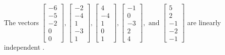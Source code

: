 \begin{exercise}
\begin{exerciseStatement}
  \end{exerciseStatement}
  \begin{exerciseAnswer}
   The vectors \(\left[\begin{array}{r}
-6 \\
-5 \\
-2 \\
0 \\
0
\end{array}\right] , \left[\begin{array}{r}
-2 \\
-4 \\
1 \\
-3 \\
1
\end{array}\right] , \left[\begin{array}{r}
4 \\
-4 \\
1 \\
0 \\
1
\end{array}\right] , \left[\begin{array}{r}
-1 \\
0 \\
-3 \\
2 \\
4
\end{array}\right] , \text{ and } \left[\begin{array}{r}
5 \\
2 \\
-1 \\
-2 \\
-1
\end{array}\right]\) are 
  	 linearly independent  .
  


  \end{exerciseAnswer}
\end{exercise}